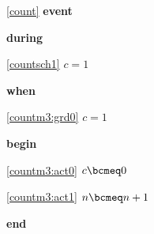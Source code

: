 \noindent \ref{count}  \textbf{event}
\begin{block}
  \item   \textbf{during}
  \begin{block}
  \item[ \eqref{countsch1} ]$c = 1$ %
  \end{block}
  \item   \textbf{when}
  \begin{block}
  \item[ \eqref{countm3:grd0} ]$c = 1$ %
  \end{block}
  \item   \textbf{begin}
  \begin{block}
  \item[ \eqref{countm3:act0} ]$c \bcmeq 0$ %
  \item[ \eqref{countm3:act1} ]$n \bcmeq n+1$ %
  \end{block}
  \item   \textbf{end} \\
\end{block}
